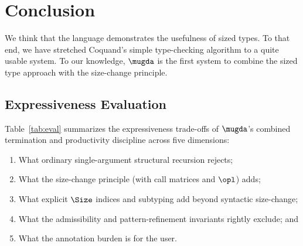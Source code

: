 \chapter{Conclusion}
We think that the \mugda language demonstrates the usefulness of sized types.
To that end, we have stretched Coquand's simple type-checking algorithm to a quite usable system.
To our knowledge, $\mugda$ is the first system to combine the sized type approach with the size-change principle.

\section*{Expressiveness Evaluation}
Table~\ref{tab:eval} summarizes the expressiveness trade-offs of $\mugda$'s combined termination and productivity discipline across five dimensions:
\begin{enumerate}
\item What ordinary single-argument structural recursion rejects;
\item What the size-change principle (with call matrices and $\opl$) adds;
\item What explicit $\Size$ indices and subtyping add beyond syntactic size-change;
\item What the admissibility and pattern-refinement invariants rightly exclude; and
\item What the annotation burden is for the user.
\end{enumerate}

